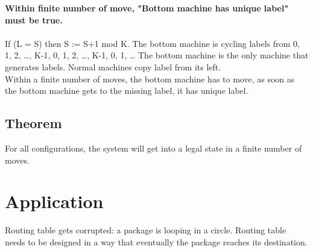 \documentclass[twoside]{article}
\begin{document}
\textbf{Within finite number of move, "Bottom machine has unique label" must be true.}\\\\
If (L = S) then S := S+1 mod K. The bottom machine is cycling labels from 0, 1, 2, \ldots, K-1, 0, 1, 2,  \ldots, K-1, 0, 1, \ldots 
The bottom machine is the only machine that generates labels. Normal machines copy label from its left.\\
Within a finite number of moves, the bottom machine has to move, as soon as the bottom machine gets to the missing label, it has unique label.

\subsection{Theorem}
For all configurations, the system will get into a legal state in a finite number of moves.

\section{Application}

Routing table gets corrupted: a package is looping in a circle. Routing table needs to be designed in a way that eventually the package reaches its destination.
\end{document}
